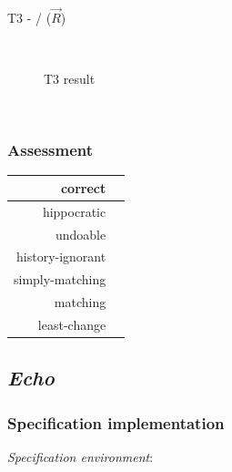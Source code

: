 \documentclass{article}
\newcommand{\cmark}{\ding{51}}%
\begin{document}
~\\

T3 -  /  ($\overrightarrow{R}$)
\begin{figure}[ht]
    \centering
    \mbox{\quad\qquad\quad
          }
    \caption{T3 result}
    \label{fig:T3}
\end{figure}

~\\

\subsubsection{Assessment}



\begin{center}
\begin{tabular}{| r | c | }
  \hline                        
  correct & \cmark \\
  \hline
  hippocratic &  \\
  \hline 
  undoable &  \\
  \hline 
  history-ignorant &  \\
  \hline 
  simply-matching &  \\
  \hline 
  matching &  \\
  \hline 
  least-change &  \\
  \hline   
\end{tabular}
\end{center}


\pagebreak
\subsection{\textit{Echo}}
\subsubsection{Specification implementation}
\textit{Specification environment}:
~\\
\end{document}
